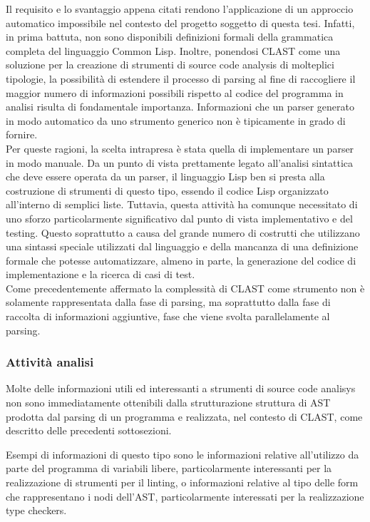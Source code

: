 Il requisito e lo svantaggio appena citati rendono l’applicazione di un
approccio automatico impossibile nel contesto del progetto soggetto di questa
tesi. Infatti, in prima battuta, non sono disponibili definizioni formali
della grammatica completa del linguaggio Common Lisp. Inoltre, ponendosi CLAST
come una soluzione per la creazione di strumenti di source code analysis di
molteplici tipologie, la possibilità di estendere il processo di parsing al
fine di raccogliere il maggior numero di informazioni possibili rispetto al
codice del programma in analisi risulta di fondamentale importanza.
Informazioni che un parser generato in modo automatico da uno strumento
generico non è tipicamente in grado di fornire.\\

Per queste ragioni, la scelta intrapresa è stata quella di implementare un
parser in modo manuale. Da un punto di vista prettamente legato all’analisi
sintattica che deve essere operata da un parser, il linguaggio Lisp ben si
presta alla costruzione di strumenti di questo tipo, essendo il codice Lisp
organizzato all’interno di semplici liste. Tuttavia, questa attività ha
comunque necessitato di uno sforzo particolarmente significativo dal punto di
vista implementativo e del testing. Questo soprattutto a causa del grande
numero di costrutti che utilizzano una sintassi speciale utilizzati dal
linguaggio e della mancanza di una definizione formale che potesse
automatizzare, almeno in parte, la generazione del codice di implementazione e
la ricerca di casi di test.\\

Come precedentemente affermato la complessità di CLAST come strumento non è
solamente rappresentata dalla fase di parsing, ma soprattutto dalla fase di
raccolta di informazioni aggiuntive, fase che viene svolta parallelamente al
parsing.

\subsubsection{Attività analisi}

Molte delle informazioni utili ed interessanti a strumenti di source code
analisys non sono immediatamente ottenibili dalla strutturazione struttura di
AST prodotta dal parsing di un programma e realizzata, nel contesto di CLAST,
come descritto delle precedenti sottosezioni.

Esempi di informazioni di questo tipo sono le informazioni relative
all'utilizzo da parte del programma di variabili libere, particolarmente
interessanti per la realizzazione di strumenti per il linting, o informazioni
relative al tipo delle form che rappresentano i nodi dell'AST, particolarmente
interessati per la realizzazione type checkers.\\

